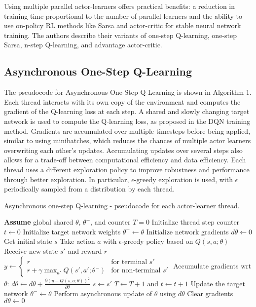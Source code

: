 \documentclass{article}
\begin{document}
Using multiple parallel actor-learners offers practical benefits: a reduction in training time proportional to the number of parallel learners and the ability to use on-policy RL methods like Sarsa and actor-critic for stable neural network training. The authors describe their variants of one-step Q-learning, one-step Sarsa, n-step Q-learning, and advantage actor-critic.

\subsection{Asynchronous One-Step Q-Learning}
The pseudocode for Asynchronous One-Step Q-Learning is shown in Algorithm 1. Each thread interacts with its own copy of the environment and computes the gradient of the Q-learning loss at each step. A shared and slowly changing target network is used to compute the Q-learning loss, as proposed in the DQN training method. Gradients are accumulated over multiple timesteps before being applied, similar to using minibatches, which reduces the chances of multiple actor learners overwriting each other’s updates. Accumulating updates over several steps also allows for a trade-off between computational efficiency and data efficiency. Each thread uses a different exploration policy to improve robustness and performance through better exploration. In particular, \(\epsilon\)-greedy exploration is used, with \(\epsilon\) periodically sampled from a distribution by each thread.

\begin{algorithm}[H]
    \caption{Asynchronous one-step Q-learning - pseudocode for each actor-learner thread.}
    \begin{algorithmic}[1]
    \State \textbf{Assume} global shared $\theta$, $\theta^{-}$, and counter $T = 0$
    \State Initialize thread step counter $t \gets 0$
    \State Initialize target network weights $\theta^{-} \gets \theta$
    \State Initialize network gradients $d\theta \gets 0$
    \State Get initial state $s$
    \Repeat
        \State Take action $a$ with $\epsilon$-greedy policy based on $Q(s, a; \theta)$
        \State Receive new state $s'$ and reward $r$
        \State $y \gets 
            \begin{cases} 
              r & \text{for terminal } s' \\
              r + \gamma \max_{a'} Q(s', a'; \theta^-) & \text{for non-terminal } s'
            \end{cases}$
        \State Accumulate gradients wrt $\theta$: $d\theta \gets d\theta + \frac{\partial (y - Q(s, a; \theta))^2}{\partial \theta}$
        \State $s \gets s'$
        \State $T \gets T + 1$ and $t \gets t + 1$
            \State Update the target network $\theta^- \gets \theta$
        \EndIf
            \State Perform asynchronous update of $\theta$ using $d\theta$
            \State Clear gradients $d\theta \gets 0$
        \EndIf
    \end{algorithmic}
    \end{algorithm}
    
\end{document}
